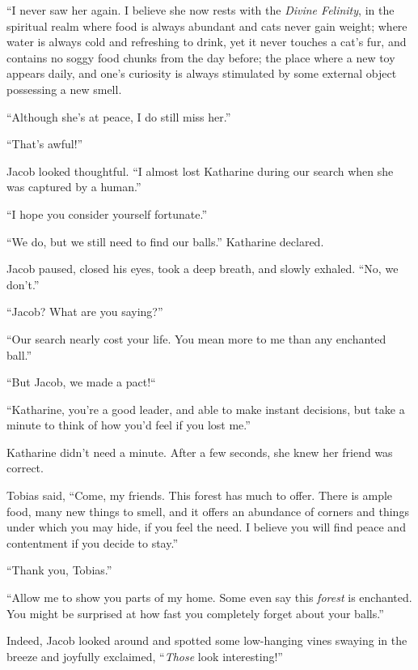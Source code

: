 “I never saw her again. I believe she now rests with the \textit{Divine Felinity}, in the spiritual realm where food is always abundant and cats never gain weight; where water is always cold and refreshing to drink, yet it never touches a cat's fur, and contains no soggy food chunks from the day before; the place where a new toy appears daily, and one's curiosity is always stimulated by some external object possessing a new smell.

“Although she's at peace, I do still miss her.”

“That's awful!”

Jacob looked thoughtful. “I almost lost Katharine during our search when she was captured by a human.”

“I hope you consider yourself fortunate.”

“We do, but we still need to find our balls.” Katharine declared.

Jacob paused, closed his eyes, took a deep breath, and slowly exhaled. “No, we don't.”

“Jacob? What are you saying?”

“Our search nearly cost your life. You mean more to me than any enchanted ball.”

“But Jacob, we made a pact!“

“Katharine, you're a good leader, and able to make instant decisions, but take a minute to think of how you'd feel if you lost me.”

Katharine didn't need a minute. After a few seconds, she knew her friend was correct.

Tobias said, “Come, my friends. This forest has much to offer. There is ample food, many new things to smell, and it offers an abundance of corners and things under which you may hide, if you feel the need. I believe you will find peace and contentment if you decide to stay.”

“Thank you, Tobias.”

“Allow me to show you parts of my home. Some even say this \textit{forest} is enchanted. You might be surprised at how fast you completely forget about your balls.”

Indeed, Jacob looked around and spotted some low-hanging vines swaying in the breeze and joyfully exclaimed, “\textit{Those} look interesting!”